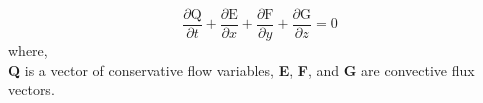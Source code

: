 \begin{equation}
\frac{\partial \mathrm{Q}}{\partial t}+\frac{\partial \mathrm{E}}{\partial x}+\frac{\partial \mathrm{F}}{\partial y}+\frac{\partial \mathrm{G}}{\partial z}=0
\label{euler_equation}
\end{equation}
where,\\
\textbf{Q} is a vector of conservative flow variables,\textbf{ E}, \textbf{F}, and\textbf{ G} are convective flux vectors.